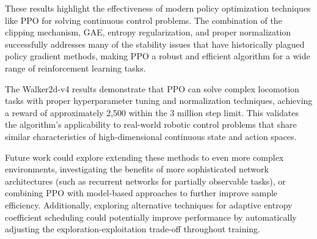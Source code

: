 \documentclass[a4paper,twocolumn]{article}
\begin{document}
These results highlight the effectiveness of modern policy optimization techniques like PPO for solving continuous control problems. The combination of the clipping mechanism, GAE, entropy regularization, and proper normalization successfully addresses many of the stability issues that have historically plagued policy gradient methods, making PPO a robust and efficient algorithm for a wide range of reinforcement learning tasks.

The Walker2d-v4 results demonstrate that PPO can solve complex locomotion tasks with proper hyperparameter tuning and normalization techniques, achieving a reward of approximately 2,500 within the 3 million step limit. This validates the algorithm's applicability to real-world robotic control problems that share similar characteristics of high-dimensional continuous state and action spaces.

Future work could explore extending these methods to even more complex environments, investigating the benefits of more sophisticated network architectures (such as recurrent networks for partially observable tasks), or combining PPO with model-based approaches to further improve sample efficiency. Additionally, exploring alternative techniques for adaptive entropy coefficient scheduling could potentially improve performance by automatically adjusting the exploration-exploitation trade-off throughout training.


\printbibliography
\end{document}
